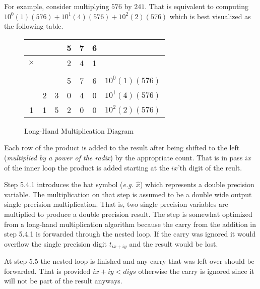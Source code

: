 \documentclass[b5paper]{book}
\begin{document}
For example, consider multiplying $576$ by $241$.  That is equivalent to computing $10^0(1)(576) + 10^1(4)(576) + 10^2(2)(576)$ which is best
visualized as the following table.

\begin{figure}[here]
\begin{center}
\begin{tabular}{|c|c|c|c|c|c|c|}
\hline   &&          & 5 & 7 & 6 & \\
\hline   $\times$&&  & 2 & 4 & 1 & \\
\hline &&&&&&\\
  &&          & 5 & 7 & 6 & $10^0(1)(576)$ \\
  &2 &   3    & 0 & 4 & 0 & $10^1(4)(576)$ \\
  1 & 1 & 5 & 2 & 0 & 0 &  $10^2(2)(576)$ \\
\hline  
\end{tabular}
\end{center}
\caption{Long-Hand Multiplication Diagram}
\end{figure}

Each row of the product is added to the result after being shifted to the left (\textit{multiplied by a power of the radix}) by the appropriate 
count.  That is in pass $ix$ of the inner loop the product is added starting at the $ix$'th digit of the reult.

Step 5.4.1 introduces the hat symbol (\textit{e.g. $\hat x$}) which represents a double precision variable.  The multiplication on that step
is assumed to be a double wide output single precision multiplication.  That is, two single precision variables are multiplied to produce a
double precision result.  The step is somewhat optimized from a long-hand multiplication algorithm because the carry from the addition in step
5.4.1 is forwarded through the nested loop.  If the carry was ignored it would overflow the single precision digit $t_{ix+iy}$ and the result
would be lost.  

At step 5.5 the nested loop is finished and any carry that was left over should be forwarded.  That is provided $ix + iy < digs$ otherwise the
carry is ignored since it will not be part of the result anyways.  
\end{document}
